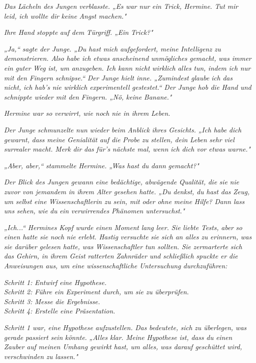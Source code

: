 {\emph{Das Lächeln des Jungen verblasste. „Es war nur ein Trick, Hermine. Tut mir leid, ich wollte dir keine Angst machen."}

\emph{Ihre Hand} \emph{stoppte} \emph{auf dem Türgriff. „Ein} \emph{\emph{Trick?}"}

\emph{„Ja,“ sagte der Junge. „Du hast mich aufgefordert, meine Intelligenz zu demonstrieren. Also habe ich etwas anscheinend unmögliches gemacht, was immer ein guter Weg ist, um anzugeben. Ich kann nicht} \emph{\emph{wirklich}} \emph{alles tun, indem ich nur mit den Fingern schnipse.“ Der Junge hielt inne. „Zumindest} \emph{\emph{glaube}} \emph{ich das nicht, ich hab's nie wirklich experimentell gestestet.“ Der Junge hob die Hand und schnippte wieder mit den Fingern. „Nö, keine Banane."}

\emph{Hermine war so verwirrt, wie noch nie in ihrem Leben.}

\emph{Der Junge schmunzelte nun wieder beim Anblick ihres Gesichts. „Ich habe dich} \emph{\emph{gewarnt,}} \emph{dass meine Genialität auf die Probe zu stellen, dein Leben sehr viel surrealer macht. Merk dir das für's nächste mal, wenn ich dich vor etwas warne."}

\emph{„Aber, aber,“ stammelte Hermine. „Was hast du dann} \emph{\emph{gemacht?}"}

\emph{Der Blick des Jungen gewann eine bedächtige, abwägende Qualität, die sie nie zuvor von jemandem in ihrem Alter gesehen hatte. „Du denkst, du hast das Zeug, um selbst eine Wissenschaftlerin zu sein, mit oder ohne meine Hilfe? Dann lass uns sehen, wie} \emph{\emph{du}} \emph{ein verwirrendes Phänomen untersuchst."}

\emph{„Ich...“ Hermines Kopf wurde einen Moment lang leer. Sie liebte Tests, aber} \emph{\emph{so}} \emph{einen hatte sie noch nie} \emph{erlebt. Hastig versuchte sie sich an alles zu erinnern, was sie darüber gelesen hatte, was Wissenschaftler tun sollten. Sie zermarterte sich das Gehirn, in ihrem Geist ratterten Zahnräder und schließlich spuckte er die Anweisungen aus, um eine wissenschaftliche Untersuchung durchzuführen:}

\emph{Schritt 1: Entwirf eine Hypothese.\\ Schritt 2: Führe ein Experiment durch, um sie zu überprüfen.\\ Schritt 3: Messe die Ergebnisse.\\ Schritt 4: Erstelle eine Präsentation.}

\emph{Schritt 1 war, eine Hypothese aufzustellen. Das bedeutete, sich zu überlegen, was gerade passiert sein} \emph{\emph{könnte.}} \emph{„Alles klar. Meine Hypothese ist, dass du einen Zauber auf meinen Umhang gewirkt hast, um alles, was darauf geschüttet wird, verschwinden zu lassen."}

}

